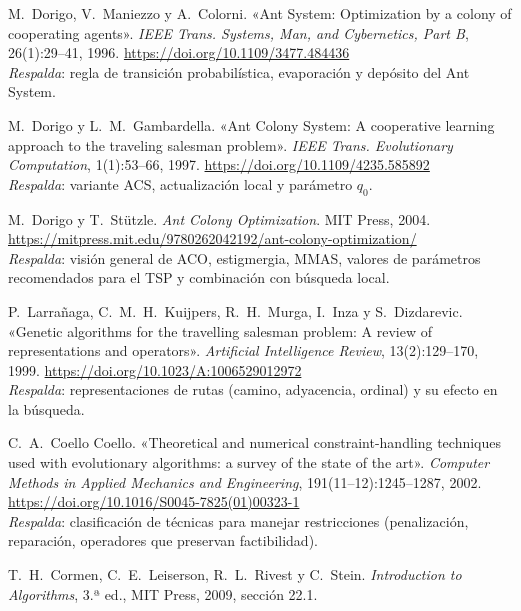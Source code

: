 \documentclass[11pt,letterpaper]{article}
\theoremstyle{definition}
\begin{document}
\begin{enumerate}[label={[\arabic*]},leftmargin=*]
  \item M.~Dorigo, V.~Maniezzo y A.~Colorni. «Ant System: Optimization by a colony of
        cooperating agents». \emph{IEEE Trans. Systems, Man, and Cybernetics, Part B},
        26(1):29--41, 1996.
        \url{https://doi.org/10.1109/3477.484436}\\
        \emph{Respalda}: regla de transición probabilística, evaporación y depósito del
        Ant System.
  \item M.~Dorigo y L.~M.~Gambardella. «Ant Colony System: A cooperative learning approach to
        the traveling salesman problem». \emph{IEEE Trans. Evolutionary Computation},
        1(1):53--66, 1997.
        \url{https://doi.org/10.1109/4235.585892}\\
        \emph{Respalda}: variante ACS, actualización local y parámetro $q_0$.
  \item M.~Dorigo y T.~Stützle. \emph{Ant Colony Optimization}. MIT Press, 2004.
        \url{https://mitpress.mit.edu/9780262042192/ant-colony-optimization/}\\
        \emph{Respalda}: visión general de ACO, estigmergia, MMAS, valores de parámetros
        recomendados para el TSP y combinación con búsqueda local.
  \item P.~Larrañaga, C.~M.~H.~Kuijpers, R.~H.~Murga, I.~Inza y S.~Dizdarevic. «Genetic
        algorithms for the travelling salesman problem: A review of representations and
        operators». \emph{Artificial Intelligence Review}, 13(2):129--170, 1999.
        \url{https://doi.org/10.1023/A:1006529012972}\\
        \emph{Respalda}: representaciones de rutas (camino, adyacencia, ordinal) y su
        efecto en la búsqueda.
  \item C.~A.~Coello Coello. «Theoretical and numerical constraint-handling techniques used
        with evolutionary algorithms: a survey of the state of the art».
        \emph{Computer Methods in Applied Mechanics and Engineering}, 191(11--12):1245--1287,
        2002. \url{https://doi.org/10.1016/S0045-7825(01)00323-1}\\
        \emph{Respalda}: clasificación de técnicas para manejar restricciones (penalización,
        reparación, operadores que preservan factibilidad).
  \item T.~H.~Cormen, C.~E.~Leiserson, R.~L.~Rivest y C.~Stein. \emph{Introduction to
        Algorithms}, 3.ª ed., MIT Press, 2009, sección 22.1.

\end{enumerate}
\end{document}
